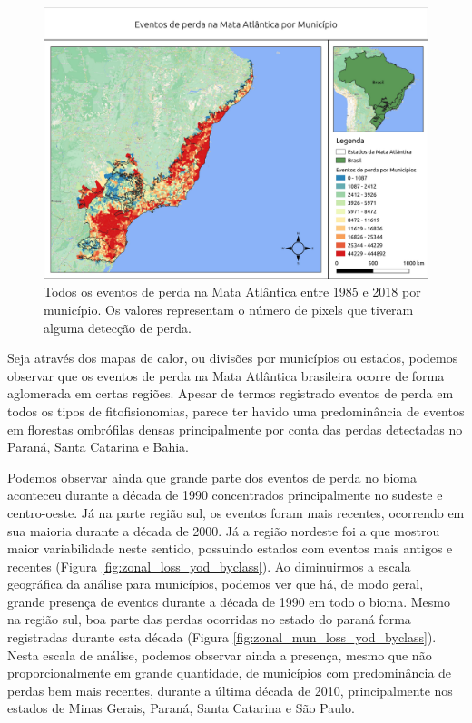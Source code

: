 \begin{figure}[H]
    \centering
    \includegraphics[scale=.5]{images/mun_loss_mun_masked85_maskedgain.pdf}
    \caption{Todos os eventos de perda na Mata Atlântica entre 1985 e 2018 por município. Os valores representam o número de pixels que tiveram alguma detecção de perda.}
    \label{fig:mun_loss_masked85_maskedgain}
\end{figure}

Seja através dos mapas de calor, ou divisões por municípios ou estados, podemos observar que os eventos de perda na Mata Atlântica brasileira ocorre de forma aglomerada em certas regiões. Apesar de termos registrado eventos de perda em todos os tipos de fitofisionomias, parece ter havido uma predominância de eventos em florestas ombrófilas densas principalmente por conta das perdas detectadas no Paraná, Santa Catarina e Bahia.

Podemos observar ainda que grande parte dos eventos de perda no bioma aconteceu durante a década de 1990 concentrados principalmente no sudeste e centro-oeste. Já na parte região sul, os eventos foram mais recentes, ocorrendo em sua maioria durante a década de 2000. Já a região nordeste foi a que mostrou maior variabilidade neste sentido, possuindo estados com eventos mais antigos e recentes (Figura \ref{fig:zonal_loss_yod_byclass}). Ao diminuirmos a escala geográfica da análise para municípios, podemos ver que há, de modo geral, grande presença de eventos durante a década de 1990 em todo o bioma. Mesmo na região sul, boa parte das perdas ocorridas no estado do paraná forma registradas durante esta década (Figura \ref{fig:zonal_mun_loss_yod_byclass}). Nesta escala de análise, podemos observar ainda a presença, mesmo que não proporcionalmente em grande quantidade, de municípios com predominância de perdas bem mais recentes, durante a última década de 2010, principalmente nos estados de Minas Gerais, Paraná, Santa Catarina e São Paulo.

